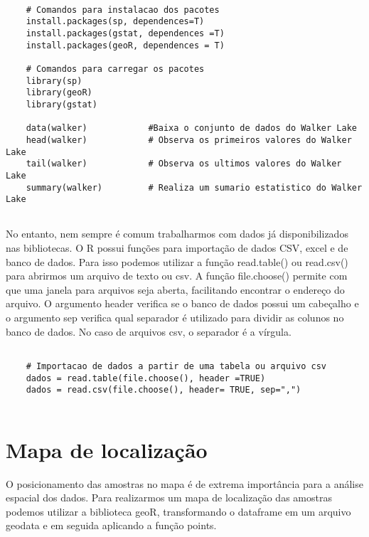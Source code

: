 \begin{scriptsize}
	\estiloR
	\begin{lstlisting}[caption={Criação de um vetor em R}, label=lst:rcode]
	
	# Comandos para instalacao dos pacotes
	install.packages(sp, dependences=T)
	install.packages(gstat, dependences =T)
	install.packages(geoR, dependences = T)
	
	# Comandos para carregar os pacotes 
	library(sp)
	library(geoR)
	library(gstat)
	
	data(walker)            #Baixa o conjunto de dados do Walker Lake
	head(walker)            # Observa os primeiros valores do Walker Lake
	tail(walker)            # Observa os ultimos valores do Walker Lake
	summary(walker)         # Realiza um sumario estatistico do Walker Lake
	
	\end{lstlisting}
\end{scriptsize}

No entanto, nem sempre é comum trabalharmos com dados já disponibilizados nas bibliotecas. O R possui funções para importação de dados CSV, excel e de banco de dados. Para isso podemos utilizar a função read.table() ou read.csv() para abrirmos um arquivo de texto ou csv. A função file.choose() permite com que uma janela para arquivos seja aberta, facilitando encontrar o endereço do arquivo. O argumento header verifica se o banco de dados possui um cabeçalho e o argumento sep verifica qual separador é utilizado para dividir as colunos no banco de dados. No caso de arquivos csv, o separador é a vírgula.


\begin{scriptsize}
	\estiloR
	\begin{lstlisting}[caption={Criação de um vetor em R}, label=lst:rcode]
	
	# Importacao de dados a partir de uma tabela ou arquivo csv
	dados = read.table(file.choose(), header =TRUE)
	dados = read.csv(file.choose(), header= TRUE, sep=",")
	
	\end{lstlisting}
\end{scriptsize}

\section{Mapa de localização} 

O posicionamento das amostras no mapa é de extrema importância para a análise espacial dos dados. Para realizarmos um mapa de localização das amostras podemos utilizar a biblioteca geoR, transformando o dataframe em um arquivo geodata e em seguida aplicando a função points. 

